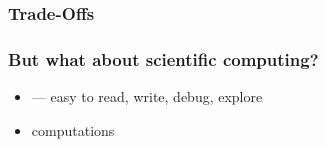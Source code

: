 \begin{frame}
    \frametitle{Trade-Offs}

    \begin{figure}
       \begin{center}
       \end{center}
    \end{figure}

\end{frame}



\begin{frame}[fragile]
    \frametitle{But what about scientific computing?}
    

    \begin{itemize}
        \item \underline{} --- easy to read, write, debug, explore
            \vspace{0.4em}
            \vspace{0.4em}
            \vspace{0.4em}
        \item \underline{} computations
    \end{itemize}

\end{frame}




